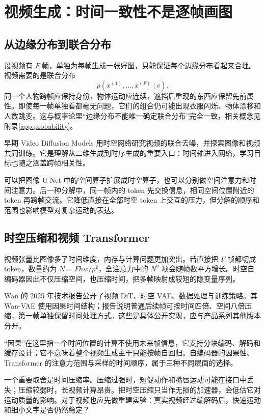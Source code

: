\section{视频生成：时间一致性不是逐帧画图}
\label{sec:application-video}

\subsection{从边缘分布到联合分布}

设视频有 $F$ 帧，单独为每帧生成一张好图，只能保证每个边缘分布看起来合理。视频需要的是联合分布
\[
p(x^{(1)},\ldots,x^{(F)}\mid c).
\]
同一个人物跨帧应保持身份，物体运动应连续，遮挡后重现的东西应保留先前属性。即使每一帧单独看都毫无问题，它们的组合仍可能出现衣服闪烁、物体漂移和人数跳变。这与概率论里“边缘分布不能唯一确定联合分布”完全一致，相关概念见附录\ref{app:probability}。

早期 Video Diffusion Models 用时空网络研究视频的联合去噪，并探索图像和视频共同训练。它是理解从二维生成到时序生成的重要入口：时间轴进入网络，学习目标也随之涵盖跨帧相关性。\cite{a_videodiff}

可以把图像 U-Net 中的空间算子扩展成时空算子，也可以分别做空间注意力和时间注意力。后一种分解中，同一帧内的 token 先交换信息，相同空间位置附近的 token 再跨帧交流。它降低直接在全部时空 token 上交互的压力，但分解的顺序和范围也影响模型对复杂运动的表达。

\subsection{时空压缩和视频 Transformer}

视频张量比图像多了时间维度，内存与计算问题更加突出。若直接把 $F$ 帧都切成 token，数量约为 $N=Fhw/p^2$，全注意力中的 $N^2$ 项会随帧数平方增长。时空自编码器因此不仅压缩空间，也压缩时间，把多帧映射成较短的隐变量序列。

Wan 的 2025 年技术报告公开了视频 DiT、时空 VAE、数据处理与训练策略。其 Wan-VAE 使用因果时间结构；报告说明普通后续帧可按时间四倍、空间八倍压缩，第一帧单独保留时间处理方式。这些是具体公开实现，应与产品系列其他版本分开。\cite{a_wan}

“因果”在这里指一个时间位置的计算不使用未来帧信息，它支持分块编码、解码和缓存设计；它不意味着整个视频生成主干只能按帧自回归。自编码器的因果性、Transformer 的注意力范围与采样的时间顺序，属于三种不同层面的选择。

一个重要取舍是时间压缩率。压缩过强时，短促动作和嘴唇运动可能在接口中丢失；压缩较弱时，长视频计算昂贵。把时空压缩只当作无损的加速器，会低估它对运动质量的影响。对于视频也应先做重建实验：真实视频经过编解码后，快速运动和细小文字是否仍然稳定？

